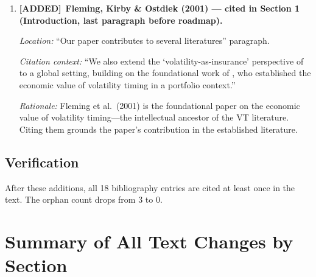 \documentclass[12pt,a4paper]{article}
\newcommand{\ADDED}{\textcolor{added}{\textbf{[ADDED]}}}
\begin{document}
\begin{enumerate}[label=\arabic*.]
\item \ADDED\ \textbf{Fleming, Kirby \& Ostdiek (2001) --- cited in Section 1 (Introduction, last paragraph before roadmap).}

\textit{Location:} ``Our paper contributes to several literatures'' paragraph.

\textit{Citation context:} ``We also extend the `volatility-as-insurance' perspective of \citet{lai2026a} to a global setting, building on the foundational work of \citet{fleming2001}, who established the economic value of volatility timing in a portfolio context.''

\textit{Rationale:} Fleming et al.\ (2001) is the foundational paper on the economic value of volatility timing---the intellectual ancestor of the VT literature. Citing them grounds the paper's contribution in the established literature.

\end{enumerate}

\subsection{Verification}

After these additions, all 18 bibliography entries are cited at least once in the text. The orphan count drops from 3 to 0.


\section{Summary of All Text Changes by Section}
\end{document}
